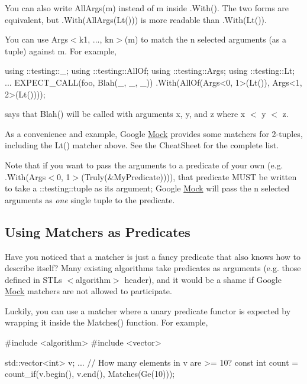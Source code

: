 You can also write {\ttfamily All\+Args(m)} instead of {\ttfamily m} inside {\ttfamily .With()}. The two forms are equivalent, but {\ttfamily .With(All\+Args(\+Lt()))} is more readable than {\ttfamily .With(\+Lt())}.

You can use {\ttfamily Args$<$k1, ..., kn$>$(m)} to match the {\ttfamily n} selected arguments (as a tuple) against {\ttfamily m}. For example,


\begin{DoxyCode}
using ::testing::\_;
using ::testing::AllOf;
using ::testing::Args;
using ::testing::Lt;
...
  EXPECT\_CALL(foo, Blah(\_, \_, \_))
      .With(AllOf(Args<0, 1>(Lt()), Args<1, 2>(Lt())));
\end{DoxyCode}


says that {\ttfamily Blah()} will be called with arguments {\ttfamily x}, {\ttfamily y}, and {\ttfamily z} where {\ttfamily x $<$ y $<$ z}.

As a convenience and example, Google \hyperlink{classMock}{Mock} provides some matchers for 2-\/tuples, including the {\ttfamily Lt()} matcher above. See the Cheat\+Sheet for the complete list.

Note that if you want to pass the arguments to a predicate of your own (e.\+g. {\ttfamily .With(Args$<$0, 1$>$(Truly(\&\+My\+Predicate)))}), that predicate M\+U\+ST be written to take a {\ttfamily \+::testing\+::tuple} as its argument; Google \hyperlink{classMock}{Mock} will pass the {\ttfamily n} selected arguments as {\itshape one} single tuple to the predicate.

\subsection*{Using Matchers as Predicates}

Have you noticed that a matcher is just a fancy predicate that also knows how to describe itself? Many existing algorithms take predicates as arguments (e.\+g. those defined in S\+TL\textquotesingle{}s {\ttfamily $<$algorithm$>$} header), and it would be a shame if Google \hyperlink{classMock}{Mock} matchers are not allowed to participate.

Luckily, you can use a matcher where a unary predicate functor is expected by wrapping it inside the {\ttfamily Matches()} function. For example,


\begin{DoxyCode}
\textcolor{preprocessor}{#include <algorithm>}
\textcolor{preprocessor}{#include <vector>}

std::vector<int> v;
...
\textcolor{comment}{// How many elements in v are >= 10?}
const \textcolor{keywordtype}{int} count = count\_if(v.begin(), v.end(), Matches(Ge(10)));
\end{DoxyCode}


